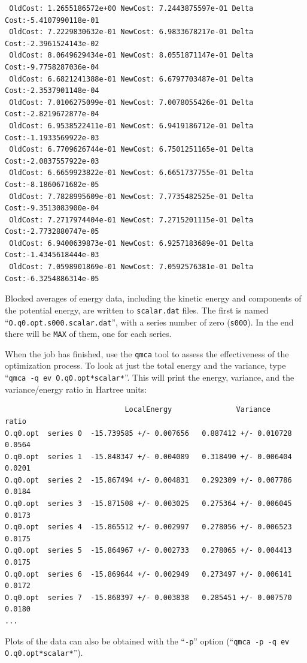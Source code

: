 \begin{shaded}
\begin{verbatim}
 OldCost: 1.2655186572e+00 NewCost: 7.2443875597e-01 Delta Cost:-5.4107990118e-01
 OldCost: 7.2229830632e-01 NewCost: 6.9833678217e-01 Delta Cost:-2.3961524143e-02
 OldCost: 8.0649629434e-01 NewCost: 8.0551871147e-01 Delta Cost:-9.7758287036e-04
 OldCost: 6.6821241388e-01 NewCost: 6.6797703487e-01 Delta Cost:-2.3537901148e-04
 OldCost: 7.0106275099e-01 NewCost: 7.0078055426e-01 Delta Cost:-2.8219672877e-04
 OldCost: 6.9538522411e-01 NewCost: 6.9419186712e-01 Delta Cost:-1.1933569922e-03
 OldCost: 6.7709626744e-01 NewCost: 6.7501251165e-01 Delta Cost:-2.0837557922e-03
 OldCost: 6.6659923822e-01 NewCost: 6.6651737755e-01 Delta Cost:-8.1860671682e-05
 OldCost: 7.7828995609e-01 NewCost: 7.7735482525e-01 Delta Cost:-9.3513083900e-04
 OldCost: 7.2717974404e-01 NewCost: 7.2715201115e-01 Delta Cost:-2.7732880747e-05
 OldCost: 6.9400639873e-01 NewCost: 6.9257183689e-01 Delta Cost:-1.4345618444e-03
 OldCost: 7.0598901869e-01 NewCost: 7.0592576381e-01 Delta Cost:-6.3254886314e-05
\end{verbatim}
\end{shaded}

Blocked averages of energy data, including the kinetic energy and components of the potential energy, are written to \texttt{scalar.dat} files.  The first is named ``\texttt{O.q0.opt.s000.scalar.dat}'', with a series number of zero (\texttt{s000}).  In the end there will be \texttt{MAX} of them, one for each series. 

When the job has finished, use the \texttt{qmca} tool to assess the effectiveness of the optimization process.  To look at just the total energy and the variance, type ``\verb|qmca -q ev O.q0.opt*scalar*|''.  This will print the energy, variance, and the variance/energy ratio in Hartree units:
\begin{shaded}
\begin{verbatim}
                            LocalEnergy               Variance           ratio
O.q0.opt  series 0  -15.739585 +/- 0.007656   0.887412 +/- 0.010728   0.0564
O.q0.opt  series 1  -15.848347 +/- 0.004089   0.318490 +/- 0.006404   0.0201
O.q0.opt  series 2  -15.867494 +/- 0.004831   0.292309 +/- 0.007786   0.0184
O.q0.opt  series 3  -15.871508 +/- 0.003025   0.275364 +/- 0.006045   0.0173
O.q0.opt  series 4  -15.865512 +/- 0.002997   0.278056 +/- 0.006523   0.0175
O.q0.opt  series 5  -15.864967 +/- 0.002733   0.278065 +/- 0.004413   0.0175
O.q0.opt  series 6  -15.869644 +/- 0.002949   0.273497 +/- 0.006141   0.0172
O.q0.opt  series 7  -15.868397 +/- 0.003838   0.285451 +/- 0.007570   0.0180
...
\end{verbatim}
\end{shaded}
\noindent
Plots of the data can also be obtained with the ``\texttt{-p}'' option (``\verb|qmca -p -q ev O.q0.opt*scalar*|'').

